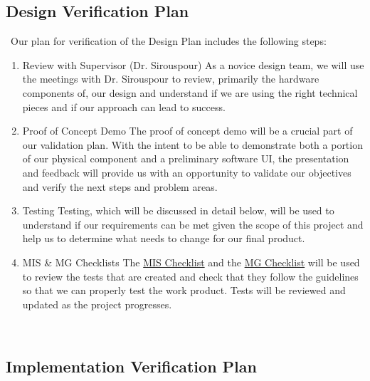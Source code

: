 \documentclass[12pt, titlepage]{article}
\begin{document}
\subsection{Design Verification Plan}
\-\
Our plan for verification of the Design Plan includes the following steps:
\begin{enumerate}
\item Review with Supervisor (Dr. Sirouspour)
\subitem As a novice design team, we will use the meetings with Dr. Sirouspour to review, primarily the hardware components of, our design and understand if we are using the right technical pieces and if our approach can lead to success. 
\item Proof of Concept Demo
\subitem The proof of concept demo will be a crucial part of our validation plan.  With the intent to be able to demonstrate both a portion of our physical component and a preliminary software UI, the presentation and feedback will provide us with an opportunity to validate our objectives and verify the next steps and problem areas.
\item Testing
\subitem Testing, which will be discussed in detail below, will be used to understand if our requirements can be met given the scope of this project and help us to determine what needs to change for our final product.
\item MIS \& MG Checklists
\subitem The \href{https://github.com/NevoAbigail/Capstone/blob/main/docs/Checklists/MIS-Checklist.pdf}{MIS Checklist} and the
 \href{https://github.com/NevoAbigail/Capstone/blob/main/docs/Checklists/MG-Checklist.pdf}{MG Checklist} will be used to review the tests that are created and check that they follow the guidelines so that we can properly test the work product. Tests will be reviewed and updated as the project progresses.
\end{enumerate}

\-\



\subsection{Implementation Verification Plan}
\end{document}
